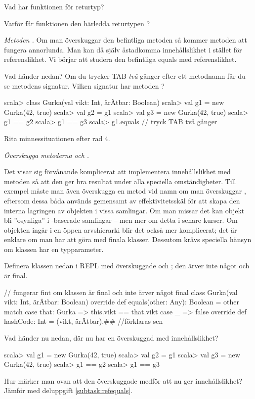 \Subtask Vad har funktionen  för returtyp?

\Subtask\Pen Varför får funktionen  den härledda returtypen ?

\Task \emph{Metoden .}  Om man överskuggar den befintliga metoden  så kommer metoden \code{==} att fungera annorlunda. Man kan då själv åstadkomma innehållslikhet i stället för referenslikhet. Vi börjar att studera den befintliga equals med referenslikhet.

\Subtask \label{subtask:refequals} Vad händer nedan? Om du trycker TAB \emph{två} gånger efter ett metodnamn får du se metodens signatur. Vilken signatur har metoden ?
\begin{REPL}
scala> class Gurka(val vikt: Int, ärÄtbar: Boolean)
scala> val g1 = new Gurka(42, true)
scala> val g2 = g1
scala> val g3 = new Gurka(42, true)
scala> g1 == g2
scala> g1 == g3
scala> g1.equals  // tryck TAB två gånger
\end{REPL}

\Subtask\Pen Rita minnessituationen efter rad 4.

\Subtask \emph{Överskugga metoderna  och .} 

\begin{Background}
Det visar sig förvånande komplicerat att implementera innehållslikhet med metoden  så att den ger bra resultat under alla speciella omständigheter. Till exempel måste man även överskugga en metod vid namn  om man överskuggar , eftersom dessa båda används gemensamt av effektivitetsskäl för att skapa den interna lagringen av objekten i vissa samlingar. Om man missar det kan objekt bli ''osynliga'' i -baserade samlingar -- men mer om detta i senare kurser. Om objekten ingår i en öppen arvshierarki blir det också mer komplicerat; det är enklare om man har att göra med finala klasser. Dessutom krävs speciella hänsyn om klassen har en typparameter.
\end{Background}

\noindent Definera klassen nedan i REPL med överskuggade  och ; den ärver inte något och är final.

\begin{Code}
// fungerar fint om klassen är final och inte ärver något
final class Gurka(val vikt: Int, ärÄtbar: Boolean) { 
  override def equals(other: Any): Boolean = other match {
    case that: Gurka => this.vikt == that.vikt
    case _ => false     
  }
  override def hashCode: Int = (vikt, ärÄtbar).## //förklaras sen
}
\end{Code}
\Subtask Vad händer nu nedan, där  nu har en överskuggad  med innehållslikhet?
\begin{REPL}
scala> val g1 = new Gurka(42, true)
scala> val g2 = g1
scala> val g3 = new Gurka(42, true)
scala> g1 == g2
scala> g1 == g3
\end{REPL}
\Subtask\Pen Hur märker man ovan att den överskuggade  medför att \code{==} nu ger innehållslikhet? Jämför med deluppgift \ref{subtask:refequals}. 

